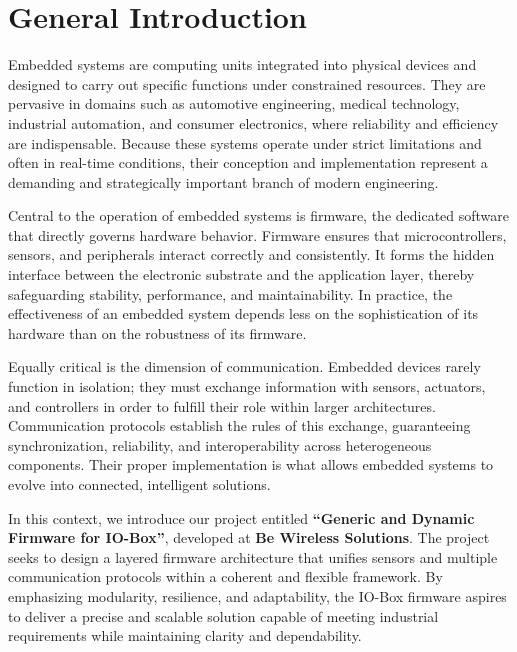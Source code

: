\section*{\huge General Introduction}


Embedded systems are computing units integrated into physical devices and designed to
carry out specific functions under constrained resources. They are pervasive in domains
such as automotive engineering, medical technology, industrial automation, and consumer
electronics, where reliability and efficiency are indispensable. Because these systems
operate under strict limitations and often in real-time conditions, their conception and
implementation represent a demanding and strategically important branch of modern
engineering.

Central to the operation of embedded systems is firmware, the dedicated software that
directly governs hardware behavior. Firmware ensures that microcontrollers, sensors, and
peripherals interact correctly and consistently. It forms the hidden interface between the
electronic substrate and the application layer, thereby safeguarding stability, performance,
and maintainability. In practice, the effectiveness of an embedded system depends less on
the sophistication of its hardware than on the robustness of its firmware.

Equally critical is the dimension of communication. Embedded devices rarely function
in isolation; they must exchange information with sensors, actuators, and controllers in
order to fulfill their role within larger architectures. Communication protocols establish
the rules of this exchange, guaranteeing synchronization, reliability, and interoperability
across heterogeneous components. Their proper implementation is what allows embedded
systems to evolve into connected, intelligent solutions.

In this context, we introduce our project entitled \textbf{“Generic and Dynamic Firmware
for IO-Box”}, developed at \textbf{Be Wireless Solutions}. The project seeks to design a
layered firmware architecture that unifies sensors and multiple communication protocols
within a coherent and flexible framework. By emphasizing modularity, resilience, and
adaptability, the IO-Box firmware aspires to deliver a precise and scalable solution capable
of meeting industrial requirements while maintaining clarity and dependability.

